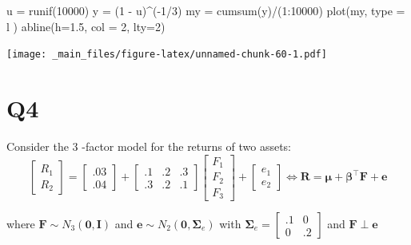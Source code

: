 \documentclass[
  oneside]{book}
\newenvironment{Shaded}{\begin{snugshade}}{\end{snugshade}}
\newcommand{\AttributeTok}[1]{\textcolor[rgb]{0.77,0.63,0.00}{#1}}
\newcommand{\DecValTok}[1]{\textcolor[rgb]{0.00,0.00,0.81}{#1}}
\newcommand{\FloatTok}[1]{\textcolor[rgb]{0.00,0.00,0.81}{#1}}
\newcommand{\FunctionTok}[1]{\textcolor[rgb]{0.00,0.00,0.00}{#1}}
\newcommand{\NormalTok}[1]{#1}
\newcommand{\OtherTok}[1]{\textcolor[rgb]{0.56,0.35,0.01}{#1}}
\newcommand{\SpecialCharTok}[1]{\textcolor[rgb]{0.00,0.00,0.00}{#1}}
\newcommand{\StringTok}[1]{\textcolor[rgb]{0.31,0.60,0.02}{#1}}
\begin{document}
\begin{Shaded}
\begin{Highlighting}[]
\NormalTok{u }\OtherTok{=} \FunctionTok{runif}\NormalTok{(}\DecValTok{10000}\NormalTok{)}
\NormalTok{y }\OtherTok{=}\NormalTok{ (}\DecValTok{1} \SpecialCharTok{{-}}\NormalTok{ u)}\SpecialCharTok{\^{}}\NormalTok{(}\SpecialCharTok{{-}}\DecValTok{1}\SpecialCharTok{/}\DecValTok{3}\NormalTok{)}
\NormalTok{my }\OtherTok{=} \FunctionTok{cumsum}\NormalTok{(y)}\SpecialCharTok{/}\NormalTok{(}\DecValTok{1}\SpecialCharTok{:}\DecValTok{10000}\NormalTok{)}
\FunctionTok{plot}\NormalTok{(my, }\AttributeTok{type =} \StringTok{\textquotesingle{}l\textquotesingle{}}\NormalTok{ )}
\FunctionTok{abline}\NormalTok{(}\AttributeTok{h=}\FloatTok{1.5}\NormalTok{, }\AttributeTok{col =} \DecValTok{2}\NormalTok{, }\AttributeTok{lty=}\DecValTok{2}\NormalTok{)}
\end{Highlighting}
\end{Shaded}

\texttt{[image: \_main\_files/figure-latex/unnamed-chunk-60-1.pdf]}

\hypertarget{q4-5}{%
\section{Q4}\label{q4-5}}

Consider the 3 -factor model for the returns of two assets:
\[
\left[\begin{array}{l}
R_1 \\
R_2
\end{array}\right]=\left[\begin{array}{l}
.03 \\
.04
\end{array}\right]+\left[\begin{array}{ccc}
.1 & .2 & .3 \\
.3 & .2 & .1
\end{array}\right]\left[\begin{array}{c}
F_1 \\
F_2 \\
F_3
\end{array}\right]+\left[\begin{array}{l}
e_1 \\
e_2
\end{array}\right] \Leftrightarrow \boldsymbol{R}=\boldsymbol{\mu}+\boldsymbol{\beta}^{\top} \boldsymbol{F}+\boldsymbol{e}
\]

where \(\boldsymbol{F} \sim N_3(\mathbf{0}, \boldsymbol{I})\) and \(\boldsymbol{e} \sim N_2\left(\mathbf{0}, \boldsymbol{\Sigma}_e\right)\) with \(\boldsymbol{\Sigma}_e=\left[\begin{array}{cc}.1 & 0 \\ 0 & .2\end{array}\right]\) and \(\boldsymbol{F} \perp \boldsymbol{e}\)
\end{document}
